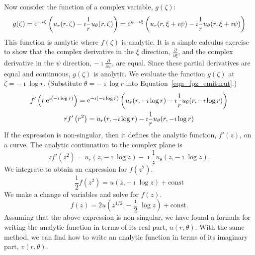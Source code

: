 {\begin{Solution}
  Now consider the function of a complex variable, $g(\zeta)$:
  \[
  g(\zeta) = \mathop{\mathrm{e}}\nolimits^{-\imath \zeta} \left( u_r(r, \zeta) - \imath \frac{1}{r} u_\theta(r, \zeta) \right)
  = \mathop{\mathrm{e}}\nolimits^{\psi - \imath \xi} \left( u_r(r, \xi + \imath \psi) - \imath \frac{1}{r} u_\theta(r, \xi + \imath \psi) \right)
  \]
  This function is analytic where $f(\zeta)$ is analytic.  
  It is a simple calculus exercise to show that the complex derivative in 
  the $\xi$ direction, $\frac{\partial}{\partial \xi}$, and the complex derivative in
  the $\psi$ direction, $-\imath \frac{\partial}{\partial \psi}$, are equal.
  Since these partial derivatives are equal and continuous, $g(\zeta)$ is 
  analytic.  We evaluate the function $g(\zeta)$ at $\zeta = - \imath \log r$.
  (Substitute $\theta = - \imath \log r$ into Equation~\ref{eqn_fpz_emiturut}.)
  \begin{gather*}
    f' \left( r \mathop{\mathrm{e}}\nolimits^{ \imath (- \imath \log r) } \right) 
    = \mathop{\mathrm{e}}\nolimits^{ -\imath (-\imath \log r) } \left( u_r( r, -\imath \log r ) 
      - \imath \frac{1}{r} u_\theta( r, -\imath \log r ) \right) 
    \\
    r f' \left( r^2 \right) 
    = u_r( r, -\imath \log r ) - \imath \frac{1}{r} u_\theta( r, - \imath \log r )
  \end{gather*}
  If the expression is non-singular, then
  it defines the analytic function, $f'(z)$, on a curve.  The analytic
  continuation to the complex plane is
  \[
  z f' \left( z^2 \right) 
  = u_r( z, - \imath \log z ) - \imath \frac{1}{z} u_\theta( z, - \imath \log z ).
  \]
  We integrate to obtain an expression for $f\left( z^2 \right)$.
  \[
  \frac{1}{2} f \left( z^2 \right) = u(z, - \imath \log z) + \mathrm{const}
  \]
  We make a change of variables and solve for $f(z)$.
  \[
  \boxed{
    f(z) = 2 u \left( z^{1/2}, - \frac{\imath}{2} \log z \right) + \mathrm{const}.
    }
  \]
  Assuming that the above expression is non-singular, we have found a formula
  for writing the analytic function in terms of its real part, $u(r, \theta)$.  
  With the same method, we can find how to write an analytic function in terms 
  of its imaginary part, $v(r, \theta)$.
\end{Solution}






\raggedbottom
}
